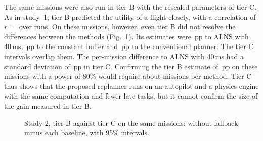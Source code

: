 The same  missions were also run in tier B with the rescaled parameters of tier C. As in study~1, tier B
predicted the utility of a flight closely, with a correlation of $r=$  over  runs. On these
missions, however, even tier B did not resolve the differences between the methods (Fig.~\ref{fig:s2bc}). Its estimates
were \,pp to ALNS with 40\,ms, \,pp to the constant buffer and \,pp to the
conventional planner. The tier C intervals overlap them. The per-mission difference to ALNS with 40\,ms had a standard
deviation of \,pp in tier C. Confirming the tier B estimate of \,pp on these missions with
a power of 80\% would require about  missions per method. Tier C thus shows that the proposed
replanner runs on an autopilot and a physics engine with the same computation and fewer late tasks, but it cannot
confirm the size of the gain measured in tier B.

\begin{figure}[t]
\centering
{}
\caption{Study 2, tier B against tier C on the same  missions: \mname{} without fallback minus each baseline, with 95\% intervals.}
\label{fig:s2bc}
\end{figure}

